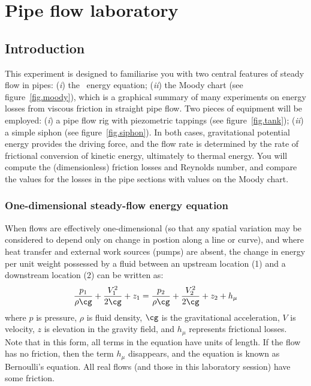 \documentclass[a4paper,11pt]{article} \pagestyle{plain}
\begin{document}

\section*{Pipe flow laboratory}

\subsection*{Introduction}

This experiment is designed to familiarise you with two central
features of steady flow in pipes: (\textit{i}) the \oned\ energy
equation; (\textit{ii}) the Moody chart (see figure~\ref{fig.moody}),
which is a graphical summary of many experiments on energy losses from
viscous friction in straight pipe flow. Two pieces of equipment will
be employed: (\textit{i}) a pipe flow rig with piezometric tappings
(see figure~\ref{fig.tank}); (\textit{ii}) a simple siphon (see
figure~\ref{fig.siphon}). In both cases, gravitational potential
energy provides the driving force, and the flow rate is determined by
the rate of frictional conversion of kinetic energy, ultimately to
thermal energy. You will compute the (dimensionless) friction losses
and Reynolds number, and compare the values for the losses in the pipe
sections with values on the Moody chart.


\subsubsection*{One-dimensional steady-flow energy equation}

When flows are effectively one-dimensional (so that any spatial
variation may be considered to depend only on change in postion along
a line or curve), and where heat transfer and external work sources
(\eg pumps) are absent, the change in energy per unit weight possessed
by a fluid between an upstream location (1) and a downstream location
(2) can be written as:
\begin{equation}
\frac{p_1}{\rho\cg} + \frac{V_1^2}{2\cg} + z_1 = 
\frac{p_2}{\rho\cg} + \frac{V_2^2}{2\cg} + z_2 +
h_\mu
\label{eq.nrg}
\end{equation}
where $p$ is pressure, $\rho$ is fluid density, $\cg$ is the
gravitational acceleration, $V$ is velocity, $z$ is elevation in the
gravity field, and $h_\mu$ represents frictional losses. Note that in
this form, all terms in the equation have units of length. If the flow
has no friction, then the term $h_\mu$ disappears, and the equation is
known as Bernoulli's equation. All real flows (and those in this
laboratory session) have some friction.
\end{document}
